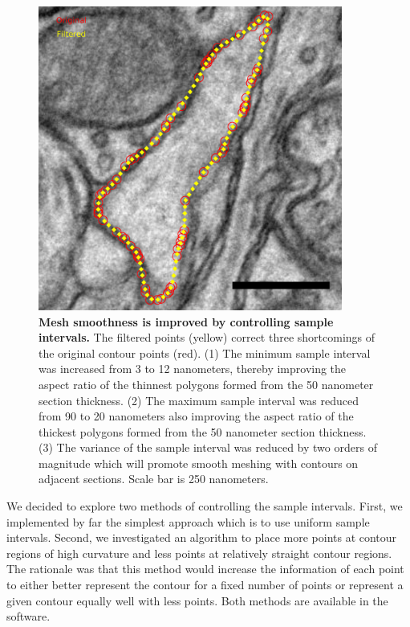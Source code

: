 \documentclass[12pt]{article}
\begin{document}
\begin{figure}[htb]
  \begin{center}
    \includegraphics[width=10cm]{figures/sample_interval_concentrated.pdf}
    \caption{\textbf{Mesh smoothness is improved by controlling sample
    intervals.} The filtered points (yellow) correct three shortcomings
    of the original contour points (red). (1) The minimum sample interval
    was increased from 3 to 12 nanometers, thereby improving the aspect
    ratio of the thinnest polygons formed from the 50 nanometer section
    thickness. (2) The maximum sample interval was reduced from 90 to 20
    nanometers also improving the aspect ratio of the thickest polygons
    formed from the 50 nanometer section thickness. (3) The variance
    of the sample interval was reduced by two orders of magnitude which
    will promote smooth meshing with contours on adjacent sections. Scale
    bar is 250 nanometers.} \label{fig:sample_interval_concentrated}
  \end{center}
\end{figure}

We decided to explore two methods of controlling the sample intervals.
First, we implemented by far the simplest approach which is to use
uniform sample intervals. Second, we investigated an algorithm to place
more points at contour regions of high curvature and less points at
relatively straight contour regions. The rationale was that this method
would increase the information of each point to either better represent
the contour for a fixed number of points or represent a given contour
equally well with less points. Both methods are available in the software.
\end{document}
